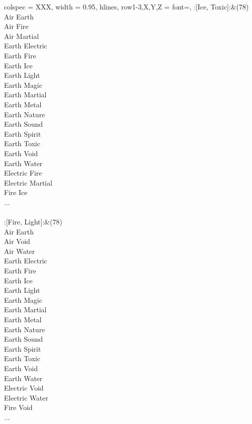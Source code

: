 \begin{longtblr}[
	caption = {2v2 Defending Weak},
	label = {2v2-Defending-Weak},
]{
	colspec = {XXX}, width = 0.95\linewidth,
	hlines,
	row{1-3,X,Y,Z} = {font=\bfseries},
}
	:[Ice, Toxic]:&{(78)\\
	Air Earth \\
	Air Fire \\
	Air Martial \\
	Earth Electric \\
	Earth Fire \\
	Earth Ice \\
	Earth Light \\
	Earth Magic \\
	Earth Martial \\
	Earth Metal \\
	Earth Nature \\
	Earth Sound \\
	Earth Spirit \\
	Earth Toxic \\
	Earth Void \\
	Earth Water \\
	Electric Fire \\
	Electric Martial \\
	Fire Ice \\
	...\\
	}\\

	:[Fire, Light]:&{(78)\\
	Air Earth \\
	Air Void \\
	Air Water \\
	Earth Electric \\
	Earth Fire \\
	Earth Ice \\
	Earth Light \\
	Earth Magic \\
	Earth Martial \\
	Earth Metal \\
	Earth Nature \\
	Earth Sound \\
	Earth Spirit \\
	Earth Toxic \\
	Earth Void \\
	Earth Water \\
	Electric Void \\
	Electric Water \\
	Fire Void \\
	...\\
	}\\


\end{longtblr}
